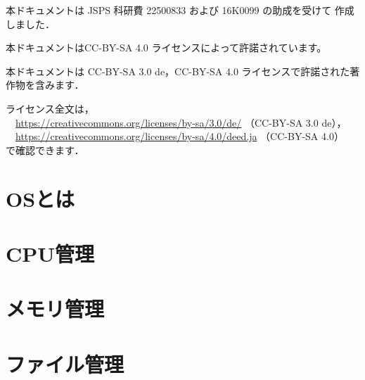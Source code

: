\documentclass[a4paper,11pt,twocolumn]{ltjsbook}     %
\begin{document}
\begin{flushleft}
本ドキュメントは JSPS 科研費 22500833 および 16K0099 の助成を受けて
作成しました．
\end{flushleft}
\vspace{0.8cm}

\begin{flushleft}
本ドキュメントはCC-BY-SA 4.0 ライセンスによって許諾されています。

本ドキュメントは
CC-BY-SA 3.0 de，CC-BY-SA 4.0 ライセンスで許諾された著作物を含みます．

ライセンス全文は，\\
　\url{https://creativecommons.org/licenses/by-sa/3.0/de/}
（CC-BY-SA 3.0 de），\\
　\url{https://creativecommons.org/licenses/by-sa/4.0/deed.ja}
（CC-BY-SA 4.0）\\
で確認できます．
\end{flushleft}

\setcounter{tocdepth}{1}
\tableofcontents

\mainmatter

\part{OSとは}

\part{CPU管理}

\part{メモリ管理}
\label{memoryManagement}

\part{ファイル管理}
\end{document}

